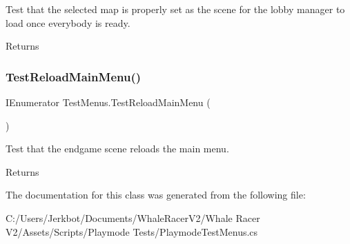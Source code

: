 Test that the selected map is properly set as the scene for the lobby manager to load once everybody is ready. 

\begin{DoxyReturn}{Returns}

\end{DoxyReturn}
\mbox{\label{class_test_menus_a75adcdf234f90804347fcfdc819120c3}} 
\subsubsection{\texorpdfstring{Test\+Reload\+Main\+Menu()}{TestReloadMainMenu()}}
{\footnotesize\ttfamily I\+Enumerator Test\+Menus.\+Test\+Reload\+Main\+Menu (\begin{DoxyParamCaption}{ }\end{DoxyParamCaption})}



Test that the endgame scene reloads the main menu. 

\begin{DoxyReturn}{Returns}

\end{DoxyReturn}


The documentation for this class was generated from the following file\+:\begin{DoxyCompactItemize}
\item 
C\+:/\+Users/\+Jerkbot/\+Documents/\+Whale\+Racer\+V2/\+Whale Racer V2/\+Assets/\+Scripts/\+Playmode Tests/Playmode\+Test\+Menus.\+cs\end{DoxyCompactItemize}
